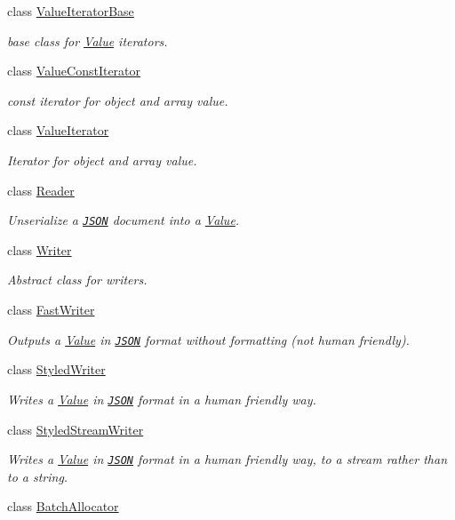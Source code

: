\begin{DoxyCompactItemize}
class \hyperlink{class_json_1_1_value_iterator_base}{Value\-Iterator\-Base}
\begin{DoxyCompactList}\small\item\em base class for \hyperlink{class_json_1_1_value}{Value} iterators. \end{DoxyCompactList}\item 
class \hyperlink{class_json_1_1_value_const_iterator}{Value\-Const\-Iterator}
\begin{DoxyCompactList}\small\item\em const iterator for object and array value. \end{DoxyCompactList}\item 
class \hyperlink{class_json_1_1_value_iterator}{Value\-Iterator}
\begin{DoxyCompactList}\small\item\em Iterator for object and array value. \end{DoxyCompactList}\item 
class \hyperlink{class_json_1_1_reader}{Reader}
\begin{DoxyCompactList}\small\item\em Unserialize a \href{http://www.json.org}{\tt J\-S\-O\-N} document into a \hyperlink{class_json_1_1_value}{Value}. \end{DoxyCompactList}\item 
class \hyperlink{class_json_1_1_writer}{Writer}
\begin{DoxyCompactList}\small\item\em Abstract class for writers. \end{DoxyCompactList}\item 
class \hyperlink{class_json_1_1_fast_writer}{Fast\-Writer}
\begin{DoxyCompactList}\small\item\em Outputs a \hyperlink{class_json_1_1_value}{Value} in \href{http://www.json.org}{\tt J\-S\-O\-N} format without formatting (not human friendly). \end{DoxyCompactList}\item 
class \hyperlink{class_json_1_1_styled_writer}{Styled\-Writer}
\begin{DoxyCompactList}\small\item\em Writes a \hyperlink{class_json_1_1_value}{Value} in \href{http://www.json.org}{\tt J\-S\-O\-N} format in a human friendly way. \end{DoxyCompactList}\item 
class \hyperlink{class_json_1_1_styled_stream_writer}{Styled\-Stream\-Writer}
\begin{DoxyCompactList}\small\item\em Writes a \hyperlink{class_json_1_1_value}{Value} in \href{http://www.json.org}{\tt J\-S\-O\-N} format in a human friendly way, to a stream rather than to a string. \end{DoxyCompactList}\item 
class \hyperlink{class_json_1_1_batch_allocator}{Batch\-Allocator}
\end{DoxyCompactItemize}
